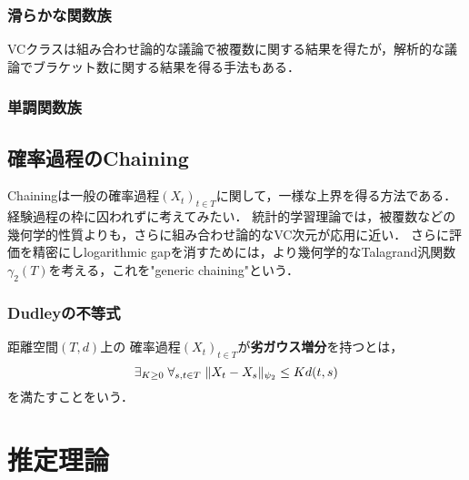\documentclass[uplatex,dvipdfmx]{jsreport}
\begin{document}
\subsection{滑らかな関数族}

\begin{tcolorbox}[colframe=ForestGreen, colback=ForestGreen!10!white,breakable,colbacktitle=ForestGreen!40!white,coltitle=black,fonttitle=\bfseries\sffamily,
title=]
    VCクラスは組み合わせ論的な議論で被覆数に関する結果を得たが，解析的な議論でブラケット数に関する結果を得る手法もある．
\end{tcolorbox}

\subsection{単調関数族}

\section{確率過程のChaining}

\begin{tcolorbox}[colframe=ForestGreen, colback=ForestGreen!10!white,breakable,colbacktitle=ForestGreen!40!white,coltitle=black,fonttitle=\bfseries\sffamily,
title=]
    Chainingは一般の確率過程$(X_t)_{t\in T}$に関して，一様な上界を得る方法である．
    経験過程の枠に囚われずに考えてみたい．
    統計的学習理論では，被覆数などの幾何学的性質よりも，さらに組み合わせ論的なVC次元が応用に近い．
    さらに評価を精密にしlogarithmic gapを消すためには，より幾何学的なTalagrand汎関数$\gamma_2(T)$を考える，これを"generic chaining"という．
\end{tcolorbox}

\subsection{Dudleyの不等式}

\begin{definition}
    距離空間$(T,d)$上の
    確率過程$(X_t)_{t\in T}$が\textbf{劣ガウス増分}を持つとは，
    \[\exists_{K\ge0}\;\forall_{s,t\in T}\;\|X_t-X_s\|_{\psi_2}\le Kd(t,s)\]
    を満たすことをいう．
\end{definition}

\chapter{推定理論}
\end{document}
